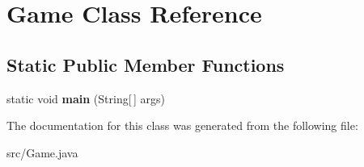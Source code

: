 \hypertarget{class_game}{\section{Game Class Reference}
\label{class_game}
}
\subsection*{Static Public Member Functions}
\begin{DoxyCompactItemize}
\item 
\hypertarget{class_game_ae52595a27ac1b327b05db2129ad81fca}{static void {\bfseries main} (String\mbox{[}$\,$\mbox{]} args)}\label{class_game_ae52595a27ac1b327b05db2129ad81fca}

\end{DoxyCompactItemize}


The documentation for this class was generated from the following file\-:\begin{DoxyCompactItemize}
\item 
src/Game.\-java\end{DoxyCompactItemize}
